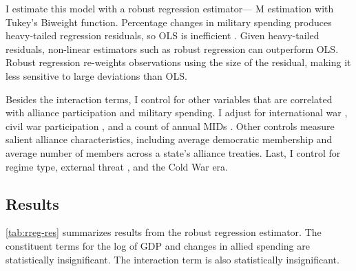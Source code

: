 \documentclass[12pt]{article}
\begin{document}
I estimate this model with a robust regression estimator--- M estimation with Tukey's Biweight function. 
Percentage changes in military spending produces heavy-tailed regression residuals, so OLS is inefficient \citep{RaineyBaissa2018}. 
Given heavy-tailed residuals, non-linear estimators such as robust regression can outperform OLS. 
Robust regression re-weights observations using the size of the residual, making it less sensitive to large deviations than OLS. 


Besides the interaction terms, I control for other variables that are correlated with alliance participation and military spending. 
I adjust for international war \citep{Reiteretal2016}, civil war participation \citep{SarkeesWayman2010}, and a count of annual MIDs \citep{Gibleretal2016}. 
Other controls measure salient alliance characteristics, including average democratic membership \citep{DigiuseppePoast2016} and average number of members across a state's alliance treaties.   
Last, I control for regime type, external threat \citep{LeedsSavun2007}, and the Cold War era. 


\subsection{Results}

 
\autoref{tab:rreg-res} summarizes results from the robust regression estimator. 
The constituent terms for the log of GDP and changes in allied spending are statistically insignificant. 
The interaction term is also statistically insignificant. 
\end{document}
